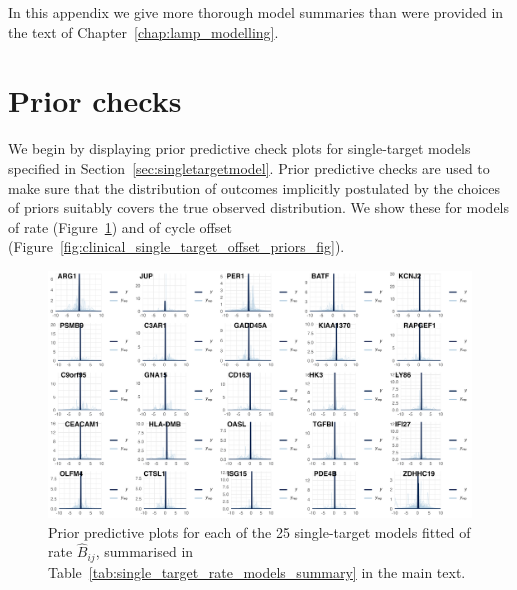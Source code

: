 \documentclass[../thesis.tex]{subfiles}
\begin{document}
In this appendix we give more thorough model summaries than were provided in the text of Chapter~\ref{chap:lamp_modelling}.
\section{Prior checks}
We begin by displaying prior predictive check plots for single-target models specified in Section~\ref{sec:singletargetmodel}. Prior predictive checks are used to make sure that the distribution of outcomes implicitly postulated by the choices of priors suitably covers the true observed distribution. We show these for models of rate (Figure~\ref{fig:clinical_single_target_rate_priors_fig}) and of cycle offset (Figure~\ref{fig:clinical_single_target_offset_priors_fig}).

\begin{figure}[!hb]
    \centering
    \includegraphics[width=\textwidth]{figures/chapter2/clinical_single_target_rate_priors_fig.png}
    \caption{Prior predictive plots for each of the 25 single-target models fitted of rate $\hat{B}_{ij}$, summarised in Table~\ref{tab:single_target_rate_models_summary} in the main text.}
    \label{fig:clinical_single_target_rate_priors_fig}
\end{figure}
\end{document}
